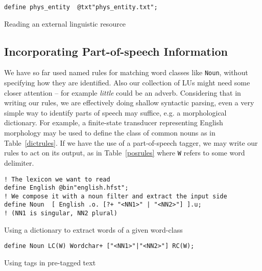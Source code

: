 \documentclass{llncs}
\begin{document}
\begin{table}[h]
\begin{center}
\small
\begin{framed}
\begin{verbatim}
define phys_entity  @txt"phys_entity.txt";
\end{verbatim}
\end{framed}
\end{center}
\normalsize
\caption{Reading an external linguistic resource}
  \label{physical}
\end{table}

\subsection{Incorporating Part-of-speech Information}

We have so far used named rules for matching word classes like \verb+Noun+,
without specifying how they are identified. Also our collection of LUs might need
some closer attention -- for example \emph{little} could be an adverb.
Considering that in writing our
rules, we are effectively doing shallow syntactic parsing, even a very simple
way to identify parts of speech may suffice, e.g. a morphological dictionary.
For example, a finite-state transducer representing English morphology may be
used to define the class of common nouns as in Table~\ref{dictrules}.
If we have the use of a part-of-speech tagger, we may write our rules to act
on its output, as in Table~\ref{posrules} where \verb+W+ refers to some word delimiter.

\begin{table}[h]
\begin{center}
\small
  \begin{framed}
\begin{verbatim}
! The lexicon we want to read
define English @bin"english.hfst";
! We compose it with a noun filter and extract the input side
define Noun  [ English .o. [?+ "<NN1>" | "<NN2>"] ].u;
! (NN1 is singular, NN2 plural)
\end{verbatim}
\end{framed}
\end{center}
  \normalsize
  \caption{Using a dictionary to extract words of a given word-class}
  \label{dictrules}
  \end{table}

\begin{table}[h]
\begin{center}
  \small
  \begin{framed}
\begin{verbatim}
define Noun LC(W) Wordchar+ ["<NN1>"|"<NN2>"] RC(W);
\end{verbatim}
\end{framed}
\end{center}
  \normalsize
  \caption{Using tags in pre-tagged text}
  \label{posrules}
  \end{table}
\end{document}
